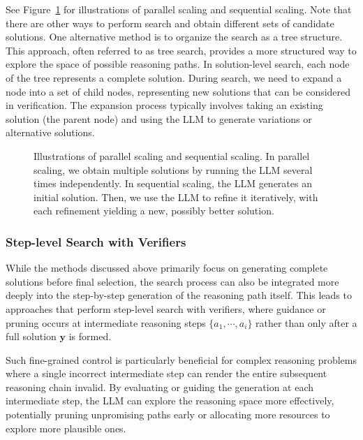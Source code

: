 See Figure~\ref{fig:parallel-and-sequential-scaling} for illustrations of parallel scaling and sequential scaling. Note that there are other ways to perform search and obtain different sets of candidate solutions. One alternative method is to organize the search as a tree structure. This approach, often referred to as tree search, provides a more structured way to explore the space of possible reasoning paths. In solution-level search, each node of the tree represents a complete solution. During search, we need to expand a node into a set of child nodes, representing new solutions that can be considered in verification. The expansion process typically involves taking an existing solution (the parent node) and using the LLM to generate variations or alternative solutions.

\begin{figure}[!t]
\centering

\vspace{-0.5cm} \caption{Illustrations of parallel scaling and sequential scaling. In parallel scaling, we obtain multiple solutions by running the LLM several times independently. In sequential scaling, the LLM generates an initial solution. Then, we use the LLM to refine it iteratively, with each refinement yielding a new, possibly better solution.}
\label{fig:parallel-and-sequential-scaling}
\end{figure}

\subsubsection{Step-level Search with Verifiers}

While the methods discussed above primarily focus on generating complete solutions before final selection, the search process can also be integrated more deeply into the step-by-step generation of the reasoning path itself. This leads to approaches that perform step-level search with verifiers, where guidance or pruning occurs at intermediate reasoning steps $\{a_1,\cdots,a_{i}\}$ rather than only after a full solution $\mathbf{y}$ is formed.

Such fine-grained control is particularly beneficial for complex reasoning problems where a single incorrect intermediate step can render the entire subsequent reasoning chain invalid. By evaluating or guiding the generation at each intermediate step, the LLM can explore the reasoning space more effectively, potentially pruning unpromising paths early or allocating more resources to explore more plausible ones.

